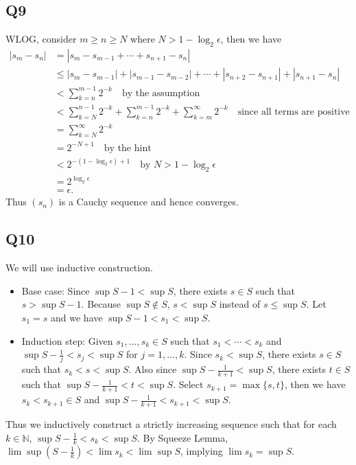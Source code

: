 \documentclass[12pt,lettersize]{article}
\newcommand{\N}{\mathbb{N}}
\begin{document}
\subsection*{Q9}
WLOG, consider $m\geq n\geq N$ where $N>1-\log_2\epsilon$, then we have
\begin{align*}
	|s_m-s_n| &= |s_m-s_{m-1}+\cdots+s_{n+1}-s_n|\\
			  &\leq |s_m-s_{m-1}|+|s_{m-1}-s_{m-2}|+\cdots+|s_{n+2}-s_{n+1}|+|s_{n+1}-s_n|\\
			  &< \sum_{k=n}^{m-1}2^{-k}\quad\text{by the assumption}\\
			  &< \sum_{k=N}^{n-1}2^{-k}+\sum_{k=n}^{m-1}2^{-k}+\sum_{k=m}^{\infty}2^{-k}\quad\text{since all terms are positive}\\
			  &= \sum_{k=N}^{\infty}2^{-k}\\
			  &= 2^{-N+1}\quad\text{by the hint}\\
			  &< 2^{-(1-\log_2\epsilon)+1}\quad\text{by $N>1-\log_2\epsilon$}\\
			  &= 2^{\log_2\epsilon}\\
			  &= \epsilon.
\end{align*}
Thus $(s_n)$ is a Cauchy sequence and hence converges.
\newpage

\subsection*{Q10}

We will use inductive construction.
\begin{itemize}
	\item Base case: Since $\sup S-1<\sup S$, there exists $s\in S$ such that $s>\sup S-1$. Because $\sup S\notin S$, $s<\sup S$ instead of $s\leq\sup S$. Let $s_1=s$ and we have $\sup S-1<s_1<\sup S$.
	\item Induction step: Given $s_1,\dots,s_k\in S$ such that $s_1<\cdots<s_k$ and $\sup S-\frac{1}{j}<s_j<\sup S$ for $j=1,\dots,k$. Since $s_k<\sup S$, there exists $s\in S$ such that $s_k<s<\sup S$. Also since $\sup S-\frac{1}{k+1}<\sup S$, there exists $t\in S$ such that $\sup S-\frac{1}{k+1}<t<\sup S$. Select $s_{k+1}=\max\{s,t\}$, then we have $s_k<s_{k+1}\in S$ and $\sup S-\frac{1}{k+1}<s_{k+1}<\sup S$.
\end{itemize}
Thus we inductively construct a strictly increasing sequence such that for each $k\in\N$, $\sup S-\frac{1}{k}<s_k<\sup S$. By Squeeze Lemma, $\lim\sup(S-\frac{1}{k})<\lim s_k<\lim\sup S$, implying $\lim s_k=\sup S$. 

\newpage
\end{document}
